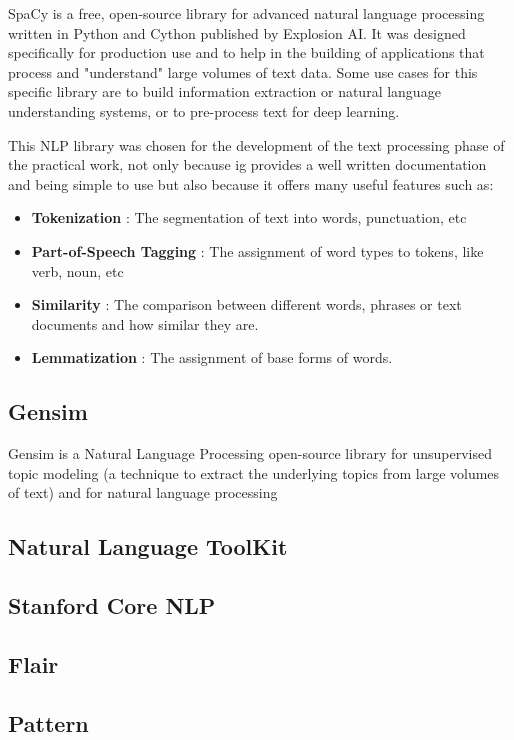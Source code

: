         \par SpaCy is a free, open-source library for advanced natural language processing written in Python and Cython published by Explosion AI. It was designed specifically for production use and to help in the building of applications that process and "understand" large volumes of text data.  Some use cases for this specific library are to build information extraction or natural language understanding systems, or to pre-process text for deep learning. \cite{Spacy2017}

        \par This NLP library was chosen for the development of the text processing phase of the practical work, not only because ig provides a well written documentation and being simple to use but also because it offers many useful features such as:

        \begin{itemize}
            \item \textbf{Tokenization} : The segmentation of text into words, punctuation, etc
            \item \textbf{Part-of-Speech Tagging} : The assignment of word types to tokens, like verb, noun, etc
            \item \textbf{Similarity} : The comparison between different words, phrases or text documents and how similar they are.
            \item \textbf{Lemmatization} : The assignment of base forms of words.
        \end{itemize}

        \subsection{Gensim}

        \par Gensim is a Natural Language Processing open-source library for unsupervised topic modeling (a technique to extract the underlying topics from large volumes of text)  and for natural language processing


        \subsection{Natural Language ToolKit}

        \subsection{Stanford Core NLP}

        \subsection{Flair}

        \subsection{Pattern}